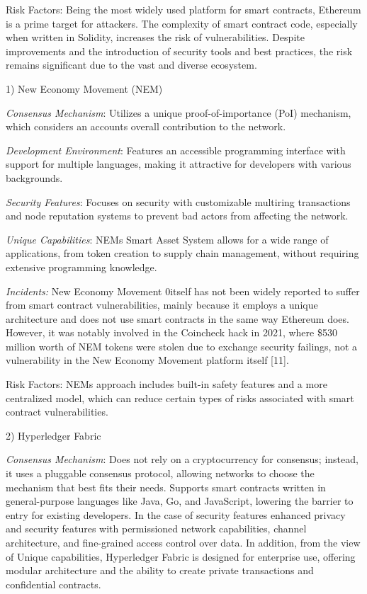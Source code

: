 Risk Factors: Being the most widely used platform for smart contracts,
Ethereum is a prime target for attackers. The complexity of smart
contract code, especially when written in Solidity, increases the risk
of vulnerabilities. Despite improvements and the introduction of
security tools and best practices, the risk remains significant due to
the vast and diverse ecosystem.

1) New Economy Movement (NEM)

\emph{Consensus Mechanism}: Utilizes a unique proof-of-importance (PoI)
mechanism, which considers an account\textquotesingle s overall
contribution to the network.

\emph{Development Environment}: Features an accessible programming
interface with support for multiple languages, making it attractive for
developers with various backgrounds.

\emph{Security Features}: Focuses on security with customizable
multiring transactions and node reputation systems to prevent bad actors
from affecting the network.

\emph{Unique Capabilities}: NEM\textquotesingle s Smart Asset System
allows for a wide range of applications, from token creation to supply
chain management, without requiring extensive programming knowledge.

\emph{Incidents:} New Economy Movement 0itself has not been widely
reported to suffer from smart contract vulnerabilities, mainly because
it employs a unique architecture and does not use smart contracts in the
same way Ethereum does. However, it was notably involved in the
Coincheck hack in 2021, where \$530 million worth of NEM tokens were
stolen due to exchange security failings, not a vulnerability in the New
Economy Movement platform itself {[}11{]}.

Risk Factors: NEM\textquotesingle s approach includes built-in safety
features and a more centralized model, which can reduce certain types of
risks associated with smart contract vulnerabilities.

2) Hyperledger Fabric

\emph{Consensus Mechanism}: Does not rely on a cryptocurrency for
consensus; instead, it uses a pluggable consensus protocol, allowing
networks to choose the mechanism that best fits their needs. Supports
smart contracts written in general-purpose languages like Java, Go, and
JavaScript, lowering the barrier to entry for existing developers. In
the case of security features enhanced privacy and security features
with permissioned network capabilities, channel architecture, and
fine-grained access control over data. In addition, from the view of
Unique capabilities, Hyperledger Fabric is designed for enterprise use,
offering modular architecture and the ability to create private
transactions and confidential contracts.

